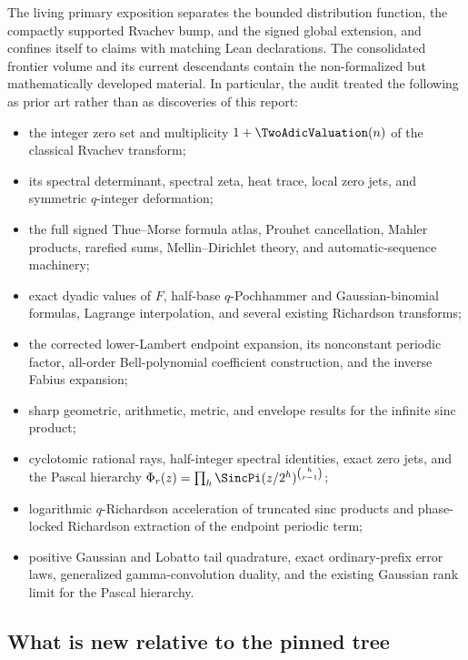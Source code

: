 \documentclass[11pt,oneside]{article}
\numberwithin{equation}{section}
\theoremstyle{definition}
\theoremstyle{remark}
\begin{document}
The living primary exposition separates the bounded distribution function, the compactly
supported Rvachev bump, and the signed global extension, and confines itself to claims with
matching Lean declarations.  The consolidated frontier volume and its current descendants
contain the non-formalized but mathematically developed material.  In particular, the audit
treated the following as prior art rather than as discoveries of this report:
\begin{itemize}
\item the integer zero set and multiplicity $1+\TwoAdicValuation(n)$ of the classical Rvachev transform;
\item its spectral determinant, spectral zeta, heat trace, local zero jets, and symmetric
      $q$-integer deformation;
\item the full signed Thue--Morse formula atlas, Prouhet cancellation, Mahler products,
      rarefied sums, Mellin--Dirichlet theory, and automatic-sequence machinery;
\item exact dyadic values of $F$, half-base $q$-Pochhammer and Gaussian-binomial formulas,
      Lagrange interpolation, and several existing Richardson transforms;
\item the corrected lower-Lambert endpoint expansion, its nonconstant periodic factor,
      all-order Bell-polynomial coefficient construction, and the inverse Fabius expansion;
\item sharp geometric, arithmetic, metric, and envelope results for the infinite sinc product;
\item cyclotomic rational rays, half-integer spectral identities, exact zero jets, and the
      Pascal hierarchy
      $\Phi_r(z)=\prod_h\SincPi(z/2^h)^{\binom h{r-1}}$;
\item logarithmic $q$-Richardson acceleration of truncated sinc products and phase-locked
      Richardson extraction of the endpoint periodic term;
\item positive Gaussian and Lobatto tail quadrature, exact ordinary-prefix error laws,
      generalized gamma-convolution duality, and the existing Gaussian rank limit for the
      Pascal hierarchy.
\end{itemize}

\subsection{What is new relative to the pinned tree}
\end{document}
